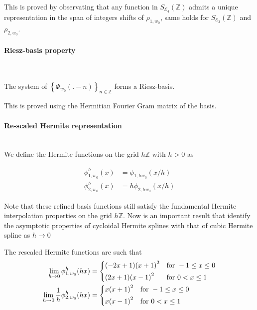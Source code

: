 \documentclass[a4paper, 11pt]{article}
\begin{document}
This is proved by observating that any function in $S_{\mathcal{E}_4}(\mathbb{Z})$ admits a unique representation in the 
span of integers shifts of $\rho_{1, w_0}$, same holds for $S_{\mathcal{E}_3}(\mathbb{Z})$  and $\rho_{2, w_0}$. 

\paragraph{Riesz-basis property} \mbox{} \\

\begin{thm}{1}
  The system of ${\left\{\Phi_{w_0}(.-n)\right\}}_{n \in \mathbb{Z}}$ forms a Riesz-basis.
\end{thm}

This is proved using the Hermitian Fourier Gram matrix of the basis. 

\paragraph{Re-scaled Hermite representation} \mbox{} \\

We define the Hermite functions on the grid $h\mathbb{Z}$ with $h > 0 $ as 

\begin{align*}
  \phi^h_{1,w_0}(x) &= \phi_{1, hw_0}(x/h) \\
  \phi^h_{2,w_0}(x) &= h\phi_{2, hw_0}(x/h)
\end{align*}

Note that these refined basis functions still satisfy the fundamental Hermite interpolation properties on the grid 
$h\mathbb{Z}$. Now is an important result that identify the asymptotic properties of cycloidal Hermite splines with that 
of cubic Hermite spline as $h \to 0$

\begin{prop}{2}
  The rescaled Hermite functions are such that
  \begin{align*}
    \lim_{h \to 0} \phi^h_{1, w_0}(hx) &=
      \begin{dcases}
        (-2x+1){(x+1)}^2 &\text{for } -1 \leq  x \leq 0 \\
        (2x+1){(x-1)}^2 &\text{for } 0 < x \leq 1\\
      \end{dcases} \\
    \lim_{h \to 0} \frac{1}{h} \phi^h_{2, w_0}(hx) &=
      \begin{dcases}
        x{(x+1)}^2 &\text{for } -1 \leq  x \leq 0 \\
        x{(x-1)}^2 &\text{for } 0 < x \leq 1\\
      \end{dcases} 
    \end{align*}
\end{prop}
\end{document}
